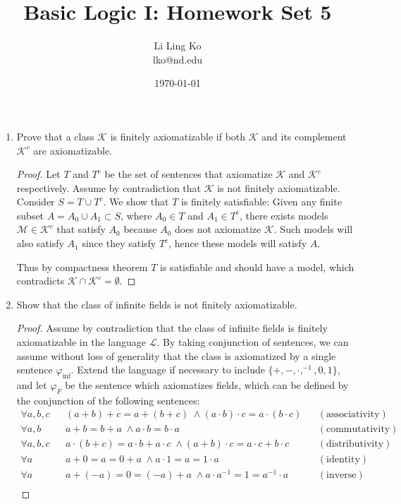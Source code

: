 \documentclass{article}
\begin{document}
\title{Basic Logic I: Homework Set 5}
\author{Li Ling Ko\\ lko@nd.edu}
\date{\today}
\maketitle

\begin{enumerate}
  \item Prove that a class $\mathcal{K}$ is finitely axiomatizable if both
    $\mathcal{K}$ and its complement $\mathcal{K}^c$ are axiomatizable.
    \begin{proof}
      Let $T$ and $T^c$ be the set of sentences that axiomatize
      $\mathcal{K}$ and $\mathcal{K}^c$ respectively. Assume by
      contradiction that $\mathcal{K}$ is not finitely axiomatizable.
      Consider $S=T\cup T^c$. We show that $T$ is finitely satisfiable:
      Given any finite subset $A=A_0\cup A_1\subset S$, where $A_0\in T$ and
      $A_1\in T^c$, there exists models $\mathcal{M}\in\mathcal{K}^c$ that
      satisfy $A_0$ because $A_0$ does not axiomatize $\mathcal{K}$. Such
      models will also satisfy $A_1$ since they satisfy $T^c$, hence these
      models will satisfy $A$.

      Thus by compactness theorem $T$ is satisfiable and should have a
      model, which contradicts $\mathcal{K}\cap\mathcal{K}^c=\emptyset$.
    \end{proof}

  \item Show that the class of infinite fields is not finitely
    axiomatizable.
    \begin{proof}
      Assume by contradiction that the class of infinite fields is finitely
      axiomatizable in the language $\mathcal{L}$. By taking conjunction of
      sentences, we can assume without loss of generality that the class is
      axiomatized by a single sentence $\varphi_{\text{inf}}$. Extend the
      language if necessary to include $\{+,-,\cdot,^{-1},0,1\}$, and let
      $\varphi_F$ be the sentence which axiomatizes fields, which can be
      defined by the conjunction of the following sentences:
      \begin{align*}
        \forall a,b,c && (a+b)+c=a+(b+c)\; \wedge (a\cdot b)\cdot
          c=a\cdot(b\cdot c)  && (\text{associativity}) \\
        \forall a,b   && a+b=b+a\; \wedge a\cdot b=b\cdot a  &&
          (\text{commutativity}) \\
        \forall a,b,c && a\cdot(b+c)=a\cdot b+a\cdot c\; \wedge (a+b)\cdot
          c=a\cdot c+b\cdot c  && (\text{distributivity}) \\
        \forall a     && a+0=a=0+a\; \wedge a\cdot1=a=1\cdot a  &&
          (\text{identity}) \\
        \forall a     && a+(-a)=0=(-a)+a\; \wedge a\cdot
          a^{-1}=1=a^{-1}\cdot a  && (\text{inverse}) \\
      \end{align*}


\end{proof}
\end{enumerate}
\end{document}
